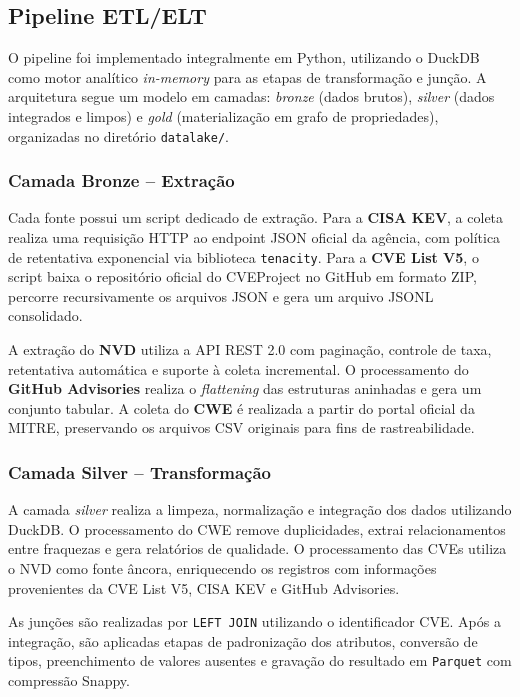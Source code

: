 \subsection{Pipeline ETL/ELT}
\label{subsec:pipeline}

O pipeline foi implementado integralmente em Python, utilizando o DuckDB como motor analítico \textit{in-memory} para as etapas de transformação e junção. A arquitetura segue um modelo em camadas: \textit{bronze} (dados brutos), \textit{silver} (dados integrados e limpos) e \textit{gold} (materialização em grafo de propriedades), organizadas no diretório \texttt{datalake/}.


\subsubsection{Camada Bronze -- Extração}

Cada fonte possui um script dedicado de extração. Para a \textbf{CISA KEV}, a coleta realiza uma requisição HTTP ao endpoint JSON oficial da agência, com política de retentativa exponencial via biblioteca \texttt{tenacity}. Para a \textbf{CVE List V5}, o script baixa o repositório oficial do CVEProject no GitHub em formato ZIP, percorre recursivamente os arquivos JSON e gera um arquivo JSONL consolidado.

A extração do \textbf{NVD} utiliza a API REST 2.0 com paginação, controle de taxa, retentativa automática e suporte à coleta incremental. O processamento do \textbf{GitHub Advisories} realiza o \textit{flattening} das estruturas aninhadas e gera um conjunto tabular. A coleta do \textbf{CWE} é realizada a partir do portal oficial da MITRE, preservando os arquivos CSV originais para fins de rastreabilidade.

\subsubsection{Camada Silver -- Transformação}

A camada \textit{silver} realiza a limpeza, normalização e integração dos dados utilizando DuckDB. O processamento do CWE remove duplicidades, extrai relacionamentos entre fraquezas e gera relatórios de qualidade. O processamento das CVEs utiliza o NVD como fonte âncora, enriquecendo os registros com informações provenientes da CVE List V5, CISA KEV e GitHub Advisories.

As junções são realizadas por \texttt{LEFT JOIN} utilizando o identificador CVE. Após a integração, são aplicadas etapas de padronização dos atributos, conversão de tipos, preenchimento de valores ausentes e gravação do resultado em \texttt{Parquet} com compressão Snappy.

